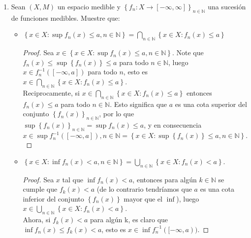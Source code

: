 \documentclass[spanish,12pt,a4paper,openany]{book}
\begin{document}
\begin{enumerate}
\begin{itemize}
\begin{proof}
				\end{proof}
				\item $\chi_{ \liminf A_{n}} = \liminf\chi_{A_{n}}$.
				\begin{proof}
					Indéntica al punto anterior.
				\end{proof}
			\end{itemize}
		\item Sean $(X,M)$ un espacio medible y $\left\{f_{n}: X \rightarrow [- \infty, \infty] \right\}_{n \in \mathbb{N}}$ una sucesión de funciones medibles. Muestre que:
			\begin{itemize}
				\item $\left\{ x \in X : \sup f_{n} (x) \leq a, n \in \mathbb{N} \right\} = \displaystyle \bigcap_{n \in \mathbb{N}} \left\{x \in X : f_{n} (x) \leq a\right\}$
				\begin{proof}
					Sea $x \in \left\{ x \in X : \sup f_{n} (x) \leq a, n \in \mathbb{N} \right\}$. Note que $f_{n}(x) \leq \sup\left\{f_{n} (x) \right\} \leq a$ para todo $n \in \mathbb{N}$, luego $x \in f_{n}^{-1}([-\infty, a])$ para todo $n$, esto es $ x \in \displaystyle \bigcap_{n \in \mathbb{N}} \left\{x \in X : f_{n} (x) \leq a\right\} $.\\
					Reciprocamente, si $x \in \bigcap_{n \in \mathbb{N}} \left\{x \in X : f_{n} (x) \leq a\right\} $ entonces $f_{n}(x) \leq a$ para todo $n \in \mathbb{N}$. Esto significa que $a$ es una cota superior del conjunto $\left\{f_{n}(x)\right\}_{n \in \mathbb{N}}$, por lo que $\sup \left\{f_{n}(x)\right\}_{n \in \mathbb{N}} = \sup f_{n}(x) \leq a$, y en consecuencia $x \in \sup f_{n} ^ {-1} ([-\infty, a]), n \in \mathbb{N} = \left\{ x \in X : \sup \left\{ f_{n} (x) \right\}  \leq a, n \in \mathbb{N} \right\}.$
				\end{proof}
\newpage
		\item $\left\{ x \in X : \inf f_{n} (x) < a, n \in \mathbb{N} \right\} = \displaystyle \bigcup_{n \in \mathbb{N}} \left\{x \in X : f_{n} (x) < a\right\}$.
			\begin{proof}
				Sea $x$ tal que $\inf f_{n} (x) < a$, entonces para algún $k \in \mathbb{N}$ se cumple que $f_{k}(x) < a$ (de lo contrario tendríamos que $a$ es una cota inferior del conjunto $\left\{f_{n}(x)\right\}$ mayor que el $\inf$), luego $x \in \displaystyle \bigcup_{n \in \mathbb{N}} \left\{x \in X :  f_{n}(x) < a\right\}$.\\
				Ahora, si $f_{k}(x) < a$ para algún k, es claro que $\inf f_{n}(x) \leq f_{k}(x) < a$, esto es $x \in \inf f_{n} ^{-1}([-\infty,a))$.
			\end{proof}

\end{itemize}
\end{enumerate}
\end{document}
